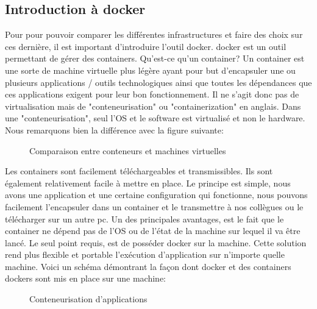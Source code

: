 \documentclass[
    iai, %
    il, %
]{heig-tb}
\begin{document}
\subsection{Introduction à \Gls{docker}}
Pour pour pouvoir comparer les différentes infrastructures et faire des choix sur ces dernière, il est important d'introduire l'outil \Gls{docker}.
\Gls{docker} est un outil permettant de gérer des containers.
Qu'est-ce qu'un container? Un container est une sorte de machine virtuelle plus légère ayant pour but d'encapsuler une ou plusieurs applications / outils technologiques ainsi que toutes les dépendances que ces applications exigent pour leur bon fonctionnement.
Il ne s'agit donc pas de virtualisation mais de "conteneurisation" ou "containerization" en anglais.
Dans une "conteneurisation", seul l'OS et le software est virtualisé et non le hardware.
Nous remarquons bien la différence avec la figure suivante:
\begin{figure}
    \caption{Comparaison entre conteneurs et machines virtuelles}
\end{figure}
Les containers sont facilement téléchargeables et transmissibles. Ils sont également relativement facile à mettre en place.
Le principe est simple, nous avons une application et une certaine configuration qui fonctionne, nous pouvons facilement l'encapsuler dans un container et le transmettre à nos collègues ou le télécharger sur un autre pc.
Un des principales avantages, est le fait que le container ne dépend pas de l'OS ou de l'état de la machine sur lequel il va être lancé.
Le seul point requis, est de posséder docker sur la machine.
Cette solution rend plus flexible et portable l'exécution d'application sur n'importe quelle machine.
Voici un schéma démontrant la façon dont docker et des containers dockers sont mis en place sur une machine:
\begin{figure}
    \caption{Conteneurisation d'applications}
\end{figure}

\end{document}
